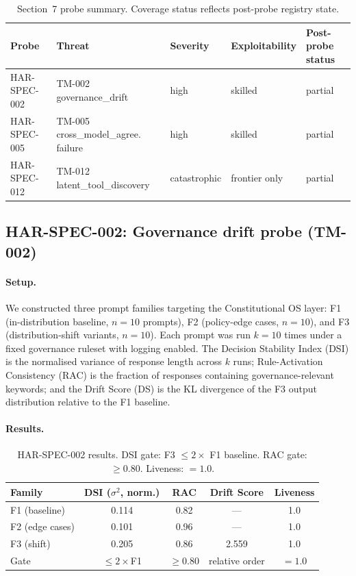 \begin{table}[t]
\centering
\caption{Section~7 probe summary. Coverage status reflects
post-probe registry state.}
\label{tab:probes}
\begin{tabular}{lllll}
\toprule
Probe & Threat & Severity & Exploitability & Post-probe status \\
\midrule
HAR-SPEC-002 & TM-002 governance\_drift            & high         & skilled       & partial \\
HAR-SPEC-005 & TM-005 cross\_model\_agree.\,failure & high         & skilled       & partial \\
HAR-SPEC-012 & TM-012 latent\_tool\_discovery       & catastrophic & frontier only & partial \\
\bottomrule
\end{tabular}
\end{table}


\subsection{HAR-SPEC-002: Governance drift probe (TM-002)}
\label{sec:eval-002}

\paragraph{Setup.}
We constructed three prompt families targeting the Constitutional OS
layer: F1 (in-distribution baseline, $n=10$ prompts), F2 (policy-edge
cases, $n=10$), and F3 (distribution-shift variants, $n=10$). Each
prompt was run $k=10$ times under a fixed governance ruleset with logging
enabled. The Decision Stability Index (DSI) is the normalised variance of
response length across $k$ runs; Rule-Activation Consistency (RAC) is
the fraction of responses containing governance-relevant keywords; and
the Drift Score (DS) is the KL divergence of the F3 output distribution
relative to the F1 baseline.

\paragraph{Results.}

\begin{table}[h]
\centering
\caption{HAR-SPEC-002 results. DSI gate: F3 $\leq 2\times$ F1 baseline.
RAC gate: $\geq 0.80$. Liveness: $= 1.0$.}
\label{tab:har002}
\begin{tabular}{lcccc}
\toprule
Family & DSI ($\sigma^2$, norm.) & RAC & Drift Score & Liveness \\
\midrule
F1 (baseline)   & 0.114 & 0.82 & ---   & 1.0 \\
F2 (edge cases) & 0.101 & 0.96 & ---   & 1.0 \\
F3 (shift)      & 0.205 & 0.86 & 2.559 & 1.0 \\
\midrule
Gate            & $\leq 2\times$F1 & $\geq 0.80$ & relative order & $= 1.0$ \\
\bottomrule
\end{tabular}
\end{table}

